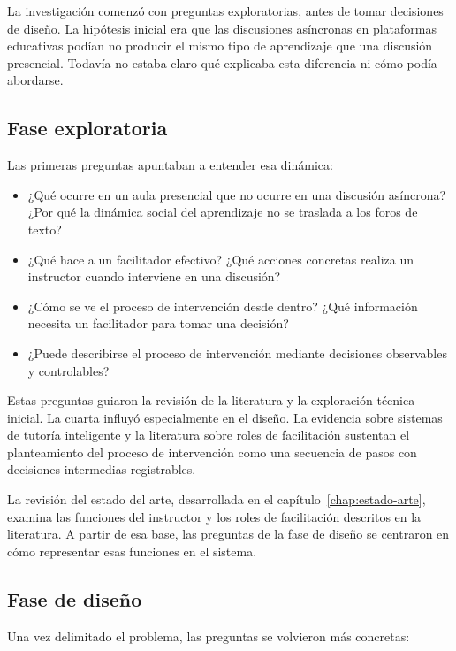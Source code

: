La investigación comenzó con preguntas exploratorias, antes de tomar decisiones de diseño. La hipótesis inicial era que las discusiones asíncronas en plataformas educativas podían no producir el mismo tipo de aprendizaje que una discusión presencial. Todavía no estaba claro qué explicaba esta diferencia ni cómo podía abordarse.

\subsection{Fase exploratoria}

Las primeras preguntas apuntaban a entender esa dinámica:

\begin{itemize}
  \item ¿Qué ocurre en un aula presencial que no ocurre en una discusión asíncrona? ¿Por qué la dinámica social del aprendizaje no se traslada a los foros de texto?
  \item ¿Qué hace a un facilitador efectivo? ¿Qué acciones concretas realiza un instructor cuando interviene en una discusión?
  \item ¿Cómo se ve el proceso de intervención desde dentro? ¿Qué información necesita un facilitador para tomar una decisión?
  \item ¿Puede describirse el proceso de intervención mediante decisiones observables y controlables?
\end{itemize}

Estas preguntas guiaron la revisión de la literatura y la exploración técnica inicial. La cuarta influyó especialmente en el diseño. La evidencia sobre sistemas de tutoría inteligente \parencite{VanLehn2011} y la literatura sobre roles de facilitación \parencite{PilkingtonWalker2003} sustentan el planteamiento del proceso de intervención como una secuencia de pasos con decisiones intermedias registrables.

La revisión del estado del arte, desarrollada en el capítulo~\ref{chap:estado-arte}, examina las funciones del instructor y los roles de facilitación descritos en la literatura. A partir de esa base, las preguntas de la fase de diseño se centraron en cómo representar esas funciones en el sistema.

\subsection{Fase de diseño}

Una vez delimitado el problema, las preguntas se volvieron más concretas:

